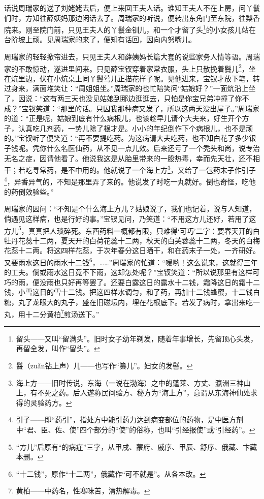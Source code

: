 \par 话说周瑞家的送了刘姥姥去后，便上来回王夫人话。谁知王夫人不在上房，问丫鬟们时，方知往薛姨妈那边闲话去了。周瑞家的听说，便转出东角门至东院，往梨香院来。刚至院门前，只见王夫人的丫鬟金钏儿，和一个才留了头\footnote{留头——又叫“留满头”。旧时女子幼年剃发，随着年事增长，先留顶心头发，再留全发，叫作“留头”。}的小女孩儿站在台阶坡上顽。见周瑞家的来了，便知有话回，因向内努嘴儿。
\par 周瑞家的轻轻掀帘进去，只见王夫人和薛姨妈长篇大套的说些家务人情等语。周瑞家的不敢惊动，遂进里间来。只见薛宝钗穿着家常衣服，头上只散挽着䰖儿\footnote{䰖（zuǎn钻上声）儿——也写作“纂儿”。妇女的发髻。}，坐在炕里边，伏在小炕桌上同丫鬟莺儿正描花样子呢。见他进来，宝钗才放下笔，转过身来，满面堆笑让：“周姐姐坐。”周瑞家的也忙陪笑问“姑娘好？”一面炕沿上坐了，因说：“这有两三天也没见姑娘到那边逛逛去，只怕是你宝兄弟冲撞了你不成？”宝钗笑道：“那里的话。只因我那种病又发了，所以这两天没出屋子。”周瑞家的道：“正是呢，姑娘到底有什么病根儿，也该趁早儿请个大夫来，好生开个方子，认真吃几剂药，一势儿除了根才是。小小的年纪倒作下个病根儿，也不是顽的。”宝钗听了便笑道：“再不要提吃药。为这病请大夫吃药，也不知白花了多少银子钱呢。凭你什么名医仙药，从不见一点儿效。后来还亏了一个秃头和尚，说专治无名之症，因请他看了。他说我这是从胎里带来的一股热毒，幸而先天壮，还不相干；若吃寻常药，是不中用的。他就说了一个海上方\footnote{海上方——旧时传说，东海（一说在渤海）之中的蓬莱、方丈、瀛洲三神山上，有不死之药。后人遂称民间验方、秘方为“海上方”，意谓从东海神仙处求得的灵验药方。}，又给了一包药末子作引子\footnote{引子——即“药引”，指处方中能引药力达到病变部位的药物，是中医方剂中“君、臣、佐、使”四个部分的“使”的俗称，也叫“引经报使”或“引经药”。}，异香异气的，不知是那里弄了来的。他说发了时吃一丸就好。倒也奇怪，吃他的药倒效验些。”
\par 周瑞家的因问：“不知是个什么海上方儿？姑娘说了，我们也记着，说与人知道，倘遇见这样病，也是行好的事。”宝钗见问，乃笑道：“不用这方儿还好，若用了这方儿\footnote{“方儿”后原有“的病症”三字，从甲戌、蒙府、戚序、甲辰、舒序、俄藏、卞藏本删。}，真真把人琐碎死。东西药料一概都有限，只难得‘可巧’二字：要春天开的白牡丹花蕊十二两，夏天开的白荷花蕊十二两，秋天的白芙蓉蕊十二两，冬天的白梅花蕊十二两。将这四样花蕊，于次年春分这日晒干，和在药末子一处，一齐研好。又要雨水这日的雨水十二钱\footnote{“十二钱”，原作“十二两”，俄藏作“可不就是”。从各本改。}，……”周瑞家的忙道：“嗳哟！这么说来，这就得三年的工夫。倘或雨水这日竟不下雨，这却怎处呢？”宝钗笑道：“所以说那里有这样可巧的雨，便没雨也只好再等罢了。还要白露这日的露水十二钱，霜降这日的霜十二钱，小雪这日的雪十二钱。把这四样水调匀，和了药，再加十二钱蜂蜜，十二钱白糖，丸了龙眼大的丸子，盛在旧磁坛内，埋在花根底下。若发了病时，拿出来吃一丸，用十二分黄柏\footnote{ 黄柏——中药名，性寒味苦，清热解毒。}煎汤送下。”
